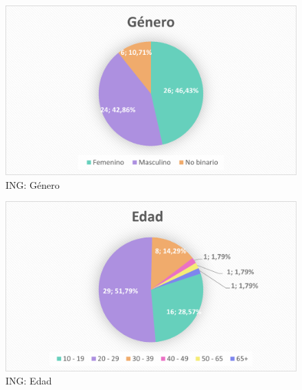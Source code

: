 \documentclass[12pt, a4paper,twoside,titlepage]{book}
\begin{document}
\begin{figure}
    \centering
    \includegraphics[width=.8\linewidth]{ANEXO ING/1AnexINGGen}
    \caption{ING: Género}
    \label{fig:INGGen}
\end{figure}


\begin{figure}
    \centering
    \includegraphics[width=.8\linewidth]{ANEXO ING/2AnexINGAge}
    \caption{ING: Edad}
    \label{fig:INGEdad}
\end{figure}
\end{document}
